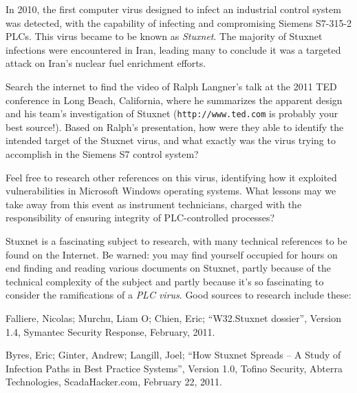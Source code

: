 

In 2010, the first computer virus designed to infect an industrial control system was detected, with the capability of infecting and compromising Siemens S7-315-2 PLCs.  This virus became to be known as {\it Stuxnet}.  The majority of Stuxnet infections were encountered in Iran, leading many to conclude it was a targeted attack on Iran's nuclear fuel enrichment efforts.

\vskip 10pt

Search the internet to find the video of Ralph Langner's talk at the 2011 TED conference in Long Beach, California, where he summarizes the apparent design and his team's investigation of Stuxnet ({\tt http://www.ted.com} is probably your best source!).  Based on Ralph's presentation, how were they able to identify the intended target of the Stuxnet virus, and what exactly was the virus trying to accomplish in the Siemens S7 control system?

Feel free to research other references on this virus, identifying how it exploited vulnerabilities in Microsoft Windows operating systems.  What lessons may we take away from this event as instrument technicians, charged with the responsibility of ensuring integrity of PLC-controlled processes?







Stuxnet is a fascinating subject to research, with many technical references to be found on the Internet.  Be warned: you may find yourself occupied for hours on end finding and reading various documents on Stuxnet, partly because of the technical complexity of the subject and partly because it's so fascinating to consider the ramifications of a {\it PLC virus}.  Good sources to research include these:

\vskip 10pt

\noindent
Falliere, Nicolas; Murchu, Liam O; Chien, Eric; ``W32.Stuxnet dossier'', Version 1.4, Symantec Security Response, February, 2011.

\vskip 10pt

\noindent
Byres, Eric; Ginter, Andrew; Langill, Joel; ``How Stuxnet Spreads -- A Study of Infection Paths in Best Practice Systems'', Version 1.0, Tofino Security, Abterra Technologies, ScadaHacker.com, February 22, 2011.

